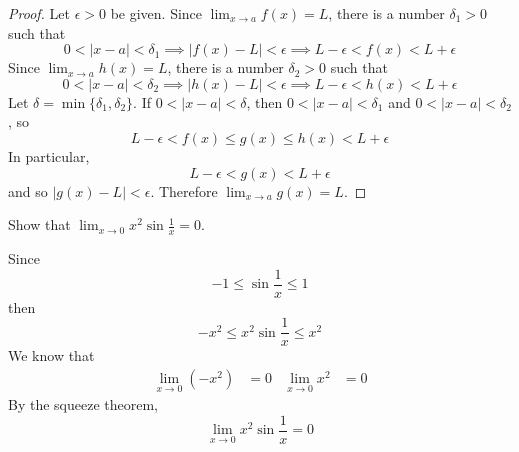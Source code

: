 \begin{proof}
    Let \(\epsilon>0\) be given.
    Since \(\displaystyle{\lim_{x\to a}f(x)=L}\),
    there is a number \(\delta_1>0\) such that
    \[0<|x-a|<\delta_1\implies|f(x)-L|<\epsilon\implies L-\epsilon<f(x)
    <L+\epsilon\]
    Since \(\displaystyle{\lim_{x\to a}h(x)=L}\),
    there is a number \(\delta_2>0\) such that
    \[0<|x-a|<\delta_2\implies|h(x)-L|<\epsilon\implies L-\epsilon<h(x)
    <L+\epsilon\]
    Let \(\delta=\min\{\delta_1,\delta_2\}\).
    If \(0<|x-a|<\delta\),
    then \(0<|x-a|<\delta_1\) and \(0<|x-a|<\delta_2\),
    so
    \[L-\epsilon<f(x)\leq g(x)\leq h(x)<L+\epsilon\]
    In particular,
    \[L-\epsilon<g(x)<L+\epsilon\]
    and so \(|g(x)-L|<\epsilon\).
    Therefore \(\displaystyle{\lim_{x\to a}g(x)=L}\).
\end{proof}
\begin{problem}
    Show that
    \(\displaystyle{\lim_{x\to 0}x^2\sin\frac{1}{x}=0}\).
\end{problem}
\begin{solution}
    Since
    \[-1\leq\sin\frac{1}{x}\leq 1\]
    then
    \[-x^2\leq x^2\sin\frac{1}{x}\leq x^2\]
    We know that
    \begin{align*}
        \lim_{x\to 0}(-x^2) &= 0 & \lim_{x\to 0}x^2 &= 0
    \end{align*}
    By the squeeze theorem,
    \[\lim_{x\to 0}x^2\sin\frac{1}{x}=0\]
\end{solution}

